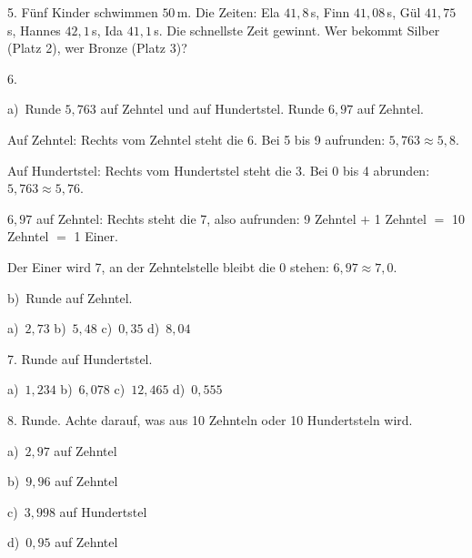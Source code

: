 \documentclass[11pt]{article}
\newcommand{\grau}[1]{{\color{mbgrau}#1}}
\begin{document}
\begin{pfaufg}{}{5.}{}
Fünf Kinder schwimmen $50$\,m. Die Zeiten: Ela $41{,}8$\,s, Finn $41{,}08$\,s, Gül $41{,}75$\,s, Hannes $42{,}1$\,s, Ida $41{,}1$\,s. Die schnellste Zeit gewinnt. Wer bekommt Silber (Platz 2), wer Bronze (Platz 3)?
\end{pfaufg}

\begin{pfaufg}{}{6.}{}
\grau{a)\ Runde $5{,}763$ auf Zehntel und auf Hundertstel. Runde $6{,}97$ auf Zehntel.\par\smallskip Auf Zehntel: Rechts vom Zehntel steht die 6. Bei 5 bis 9 aufrunden: $5{,}763 \approx 5{,}8$.\par Auf Hundertstel: Rechts vom Hundertstel steht die 3. Bei 0 bis 4 abrunden: $5{,}763 \approx 5{,}76$.\par $6{,}97$ auf Zehntel: Rechts steht die 7, also aufrunden: 9 Zehntel $+$ 1 Zehntel $=$ 10 Zehntel $=$ 1 Einer.\par Der Einer wird 7, an der Zehntelstelle bleibt die 0 stehen: $6{,}97 \approx 7{,}0$.}
\par\medskip
b)\ Runde auf Zehntel.\par\vspace{3pt} a)~$2{,}73$ \qquad b)~$5{,}48$ \qquad c)~$0{,}35$ \qquad d)~$8{,}04$
\end{pfaufg}

\begin{pfaufg}{}{7.}{}
Runde auf Hundertstel.\par\vspace{3pt} a)~$1{,}234$ \qquad b)~$6{,}078$ \qquad c)~$12{,}465$ \qquad d)~$0{,}555$
\end{pfaufg}

\begin{pfaufg}{}{8.}{}
Runde. Achte darauf, was aus 10 Zehnteln oder 10 Hundertsteln wird.\par\vspace{3pt} a)~$2{,}97$ auf Zehntel \par b)~$9{,}96$ auf Zehntel \par c)~$3{,}998$ auf Hundertstel \par d)~$0{,}95$ auf Zehntel
\end{pfaufg}
\end{document}
